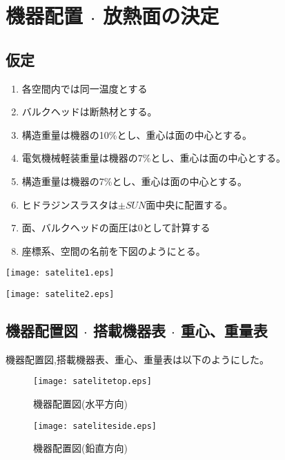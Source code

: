 \documentclass[15pt,uplatex,dvipdfmx]{jsarticle}
\begin{document}
\setcounter{section}{5}

\section{機器配置 $\cdot$ 放熱面の決定}

\subsection{仮定}
\begin{enumerate}
  \item 各空間内では同一温度とする
  \item バルクヘッドは断熱材とする。
  \item 構造重量は機器の10\%とし、重心は面の中心とする。
  \item 電気機械軽装重量は機器の7\%とし、重心は面の中心とする。
  \item 構造重量は機器の7\%とし、重心は面の中心とする。
  \item ヒドラジンスラスタは$ \pm SUN$面中央に配置する。
  \item 面、バルクヘッドの面圧は0として計算する
  \item 座標系、空間の名前を下図のようにとる。
\end{enumerate}
\begin{center}
  \texttt{[image: satelite1.eps]}
\end{center}
\begin{center}
  \texttt{[image: satelite2.eps]}
\end{center}
\newpage

\subsection{機器配置図 $\cdot$ 搭載機器表 $\cdot$ 重心、重量表}
機器配置図,搭載機器表、重心、重量表は以下のようにした。
\begin{figure}[H]
  \caption{機器配置図(水平方向)}
\begin{center}
  \texttt{[image: satelitetop.eps]}
\end{center}
\end{figure} \newpage

\begin{figure}[H]
  \caption{機器配置図(鉛直方向)}
\begin{center}
  \texttt{[image: sateliteside.eps]}
\end{center}
\end{figure} \newpage
\end{document}
